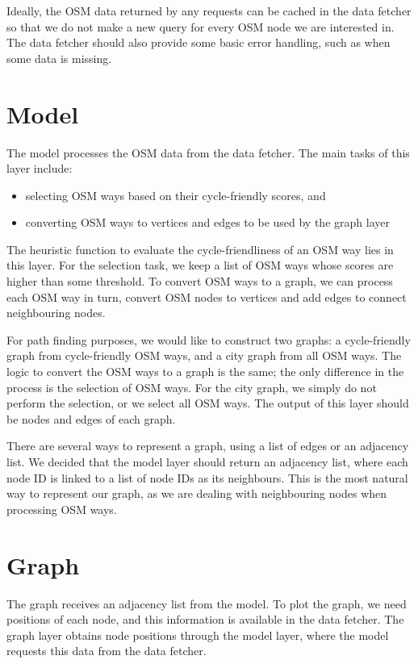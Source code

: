 \documentclass[12pt,a4paper]{report}
\begin{document}
Ideally, the OSM data returned by any requests can be cached in the data fetcher so that we do not make a new query for every OSM node we are interested in. The data fetcher should also provide some basic error handling, such as when some data is missing.

\section{Model}
The model processes the OSM data from the data fetcher. The main tasks of this layer include:
\begin{itemize}
    \item selecting OSM ways based on their cycle-friendly scores, and
    \item converting OSM ways to vertices and edges to be used by the graph layer
\end{itemize}

The heuristic function to evaluate the cycle-friendliness of an OSM way lies in this layer. For the selection task, we keep a list of OSM ways whose scores are higher than some threshold. To convert OSM ways to a graph, we can process each OSM way in turn, convert OSM nodes to vertices and add edges to connect neighbouring nodes.

For path finding purposes, we would like to construct two graphs: a cycle-friendly graph from cycle-friendly OSM ways, and a city graph from all OSM ways. The logic to convert the OSM ways to a graph is the same; the only difference in the process is the selection of OSM ways. For the city graph, we simply do not perform the selection, or we select all OSM ways. The output of this layer should be nodes and edges of each graph.

There are several ways to represent a graph, using a list of edges or an adjacency list. We decided that the model layer should return an adjacency list, where each node ID is linked to a list of node IDs as its neighbours. This is the most natural way to represent our graph, as we are dealing with neighbouring nodes when processing OSM ways.

\section{Graph}
The graph receives an adjacency list from the model. To plot the graph, we need positions of each node, and this information is available in the data fetcher. The graph layer obtains node positions through the model layer, where the model requests this data from the data fetcher.
\end{document}
